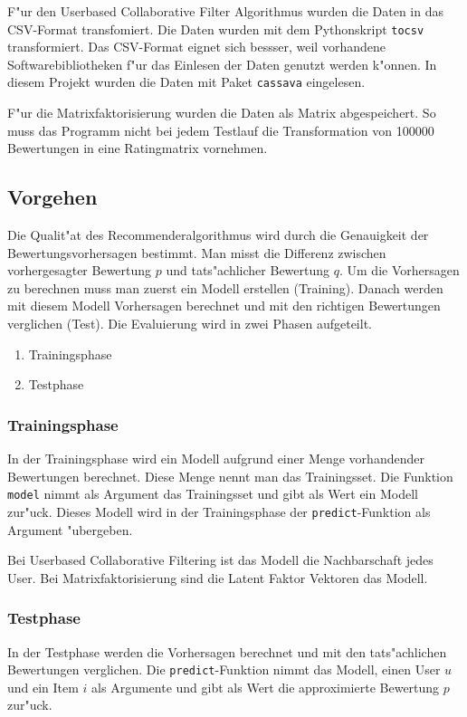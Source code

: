 \documentclass[a4paper, 12pt]{article}
\begin{document}
F"ur den Userbased Collaborative Filter Algorithmus wurden die Daten in das CSV-Format transfomiert. Die Daten wurden mit dem Pythonskript \verb|tocsv| transformiert. Das CSV-Format eignet sich bessser, weil vorhandene Softwarebibliotheken f"ur das Einlesen der Daten genutzt werden k"onnen. In diesem Projekt wurden die Daten mit Paket \verb|cassava| eingelesen.

F"ur die Matrixfaktorisierung wurden die Daten als Matrix abgespeichert. So muss das Programm nicht bei jedem Testlauf die Transformation von 100000 Bewertungen in eine Ratingmatrix vornehmen.

\subsection{Vorgehen}
\label{sec:procedure}

Die Qualit"at des Recommenderalgorithmus wird durch die Genauigkeit der Bewertungsvorhersagen bestimmt. Man misst die Differenz zwischen vorhergesagter Bewertung $p$ und tats"achlicher Bewertung $q$. 
Um die Vorhersagen zu berechnen muss man zuerst ein Modell erstellen (Training). Danach werden mit diesem Modell Vorhersagen berechnet und mit den richtigen Bewertungen verglichen (Test). Die Evaluierung wird in zwei Phasen aufgeteilt. 

\begin{enumerate}
\item Trainingsphase
\item Testphase
\end{enumerate}

\subsubsection{Trainingsphase}

In der Trainingsphase wird ein Modell aufgrund einer Menge vorhandender Bewertungen berechnet. Diese Menge nennt man das Trainingsset. Die Funktion \verb|model| nimmt als Argument das Trainingsset und gibt als Wert ein Modell zur"uck. Dieses Modell wird in der Trainingsphase der \verb|predict|-Funktion als Argument "ubergeben. 

Bei Userbased Collaborative Filtering ist das Modell die Nachbarschaft jedes User. Bei Matrixfaktorisierung sind die Latent Faktor Vektoren das Modell.

\subsubsection{Testphase}
In der Testphase werden die Vorhersagen berechnet und mit den tats"achlichen Bewertungen verglichen. Die \verb|predict|-Funktion nimmt das Modell, einen User $u$ und ein Item $i$ als Argumente und gibt als Wert die approximierte Bewertung  $p$ zur"uck.
\end{document}
